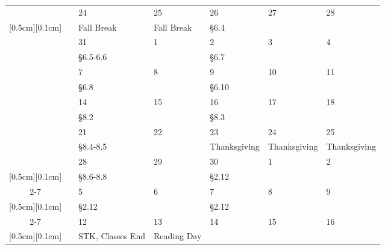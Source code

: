 \documentclass[10pt]{article}
\begin{document}
{\begin{tabular}{|c|c||p{2.9cm}|p{2.1cm}|p{2.9cm}|p{2.1cm}|p{2.1cm}|}
%
 & \multirow{2}{0.8cm}{\centering{9}} 
  & 24 & 25 & 26 & 27 & 28 \\ 
\raisebox{0cm}[0.5cm][0.1cm]{}&& 
Fall Break  & Fall Break & \S 6.4  & & \\\hline
\multirow{8}{0.8cm}{\centering{Nov}} 
 & \multirow{2}{0.8cm}{\centering{10}} 
 & 31 & 1 & 2 & 3 & 4 \\ 
\raisebox{0cm}[0.5cm][0.1cm]{}&& 
\S 6.5-6.6 & & \S6.7 & & \\\cline{2-7}
%
 & \multirow{2}{0.8cm}{\centering{11}} 
  & 7 & 8 & 9 & 10 & 11 \\ 
\raisebox{0cm}[0.5cm][0.1cm]{}&& 
\S 6.8  & & \S6.10  & & \\\cline{2-7}
%
 & \multirow{2}{0.8cm}{\centering{12}} 
  & 14 & 15 & 16 & 17 & 18\\ 
\raisebox{0cm}[0.5cm][0.1cm]{}&& 
\S 8.2 & & \S8.3 & & \\\cline{2-7}
%
 & \multirow{2}{0.8cm}{\centering{13}} 
  & 21 & 22 & 23 & 24 & 25  \\ 
\raisebox{0cm}[0.5cm][0.1cm]{}&& 
\S 8.4-8.5 &  & Thanksgiving & Thanksgiving & Thanksgiving\\\hline
%
 & \multirow{2}{0.8cm}{\centering{14}} 
 & 28 & 29 & 30  & 1 & 2  \\ 
\raisebox{0cm}[0.5cm][0.1cm]{}&& 
\S8.6-8.8 & & \S 2.12 &  & \\\cline{2-7}
\multirow{3}{0.8cm}{\centering{Dec}} 
 & \multirow{2}{0.8cm}{\centering{15}} 
 & 5 & 6 & 7 & 8 & 9   \\ 
\raisebox{0cm}[0.5cm][0.1cm]{}&& 
\S 2.12 &  & \S 2.12  & & \\\cline{2-7}
%
 & \multirow{2}{0.8cm}{\centering{16}} 
 & 12 & 13 & 14 & 15 & 16 \\ 
\raisebox{0cm}[0.5cm][0.1cm]{}&& 
STK, Classes End & Reading Day &  &  & \\\hline%
%
\end{tabular}}



\end{document}
